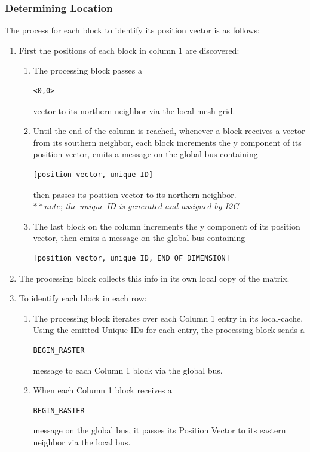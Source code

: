     \subsubsection{Determining Location}
      The process for each block to identify its position vector is as follows:
      \begin{enumerate}
        \item First the positions of each block in column 1 are discovered:
        \begin{enumerate}
          \item The processing block passes a \begin{verbatim}<0,0>\end{verbatim} vector to its northern neighbor via the local mesh grid.
          \item Until the end of the column is reached, whenever a block receives a vector from its southern neighbor, each block increments the y component of its position vector, emits a message on the global bus containing \begin{verbatim}[position vector, unique ID]\end{verbatim}then passes its position vector to its northern neighbor.\\
          $**note$; \textit{the unique ID is generated and assigned by I2C }
          \item The last block on the column increments the y component of its position vector, then emits a message on the global bus containing \begin{verbatim}[position vector, unique ID, END_OF_DIMENSION]\end{verbatim}
        \end{enumerate}
      \item The processing block collects this info in its own local copy of the matrix.
      \item To identify each block in each row:
        \begin{enumerate}
          \item The processing block iterates over each Column 1 entry in its local-cache. Using the emitted Unique IDs for each entry, the processing block sends a \begin{verbatim}BEGIN_RASTER\end{verbatim}message to each Column 1 block via the global bus.
          \item When each Column 1 block receives a \begin{verbatim}BEGIN_RASTER\end{verbatim}message on the global bus, it passes its Position Vector to its eastern neighbor via the local bus.

\end{enumerate}
\end{enumerate}
